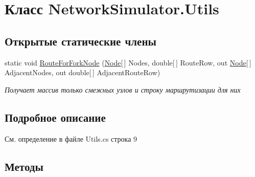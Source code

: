 \hypertarget{class_network_simulator_1_1_utils}{}\section{Класс Network\+Simulator.\+Utils}
\label{class_network_simulator_1_1_utils}
\subsection*{Открытые статические члены}
\begin{DoxyCompactItemize}
\item 
static void \hyperlink{class_network_simulator_1_1_utils_aaa072f6fa5259e0924a99ba9b63692fb}{Route\+For\+Fork\+Node} (\hyperlink{class_network_simulator_1_1_node}{Node}\mbox{[}$\,$\mbox{]} Nodes, double\mbox{[}$\,$\mbox{]} Route\+Row, out \hyperlink{class_network_simulator_1_1_node}{Node}\mbox{[}$\,$\mbox{]} Adjacent\+Nodes, out double\mbox{[}$\,$\mbox{]} Adjacent\+Route\+Row)
\begin{DoxyCompactList}\small\item\em Получает массив только смежных узлов и строку маршрутизации для них \end{DoxyCompactList}\end{DoxyCompactItemize}


\subsection{Подробное описание}


См. определение в файле Utils.\+cs строка 9



\subsection{Методы}
